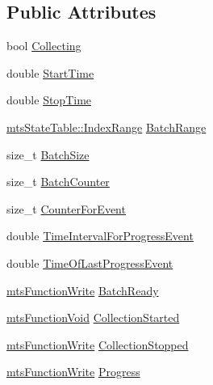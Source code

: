 \subsection*{Public Attributes}
\begin{DoxyCompactItemize}
\item 
bool \hyperlink{classmts_state_table_1_1_data_collection_info_a3cba7424d384d2c04aef689839de610f}{Collecting}
\item 
double \hyperlink{classmts_state_table_1_1_data_collection_info_a6142e6c6599148b1eadf002c9880463f}{Start\-Time}
\item 
double \hyperlink{classmts_state_table_1_1_data_collection_info_a9b815a904966196b006f88d2dc0e73b4}{Stop\-Time}
\item 
\hyperlink{classmts_state_table_1_1_index_range}{mts\-State\-Table\-::\-Index\-Range} \hyperlink{classmts_state_table_1_1_data_collection_info_aa0343b1641a1f2d77a8b3e4bfb79b17b}{Batch\-Range}
\item 
size\-\_\-t \hyperlink{classmts_state_table_1_1_data_collection_info_ac99fb26fa253839f3e56bb5102f50ed4}{Batch\-Size}
\item 
size\-\_\-t \hyperlink{classmts_state_table_1_1_data_collection_info_a30686d9c50ff6a42cff2160fec55255e}{Batch\-Counter}
\item 
size\-\_\-t \hyperlink{classmts_state_table_1_1_data_collection_info_aeefcc3cd75cdec6523e62fb6447b9aab}{Counter\-For\-Event}
\item 
double \hyperlink{classmts_state_table_1_1_data_collection_info_aa82de94c4fe55892c5be18052e5e0c0b}{Time\-Interval\-For\-Progress\-Event}
\item 
double \hyperlink{classmts_state_table_1_1_data_collection_info_a160735e608b58846356e7fc6be792832}{Time\-Of\-Last\-Progress\-Event}
\item 
\hyperlink{classmts_function_write}{mts\-Function\-Write} \hyperlink{classmts_state_table_1_1_data_collection_info_a1e655dfe05376806b0b8af648ded69e9}{Batch\-Ready}
\item 
\hyperlink{classmts_function_void}{mts\-Function\-Void} \hyperlink{classmts_state_table_1_1_data_collection_info_a95b64dcedf855f7881f4903e74101549}{Collection\-Started}
\item 
\hyperlink{classmts_function_write}{mts\-Function\-Write} \hyperlink{classmts_state_table_1_1_data_collection_info_ae4ff6ebaf115c070c00ff0686997383f}{Collection\-Stopped}
\item 
\hyperlink{classmts_function_write}{mts\-Function\-Write} \hyperlink{classmts_state_table_1_1_data_collection_info_ae4e104e80fed9252cf855f90dee1a1b9}{Progress}
\end{DoxyCompactItemize}


